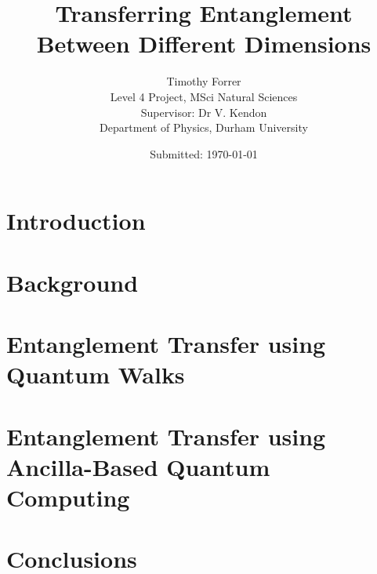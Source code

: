 \documentclass[12pt, onecolumn]{article}
\begin{document}
\title{\bf{Transferring Entanglement Between Different Dimensions}} 
\date{Submitted: \today{}}
\author{
    Timothy Forrer\\
    Level 4 Project, MSci Natural Sciences\\
    Supervisor: Dr V. Kendon\\
    Department of Physics, Durham University}

\maketitle



\newpage

\tableofcontents

\newpage

\section{Introduction}
\label{section:intro}


\section{Background}
\label{section:background}

\label{subsection:qw}

\label{subsection:aqc}

\section{Entanglement Transfer using Quantum Walks}
\label{section:qw_transfer}


\section{Entanglement Transfer using Ancilla-Based Quantum Computing}
\label{section:aqc_transfer}

\section{Conclusions}
\label{section:conclusion}




\printbibliography[heading=bibintoc]

\newpage


\end{document}
